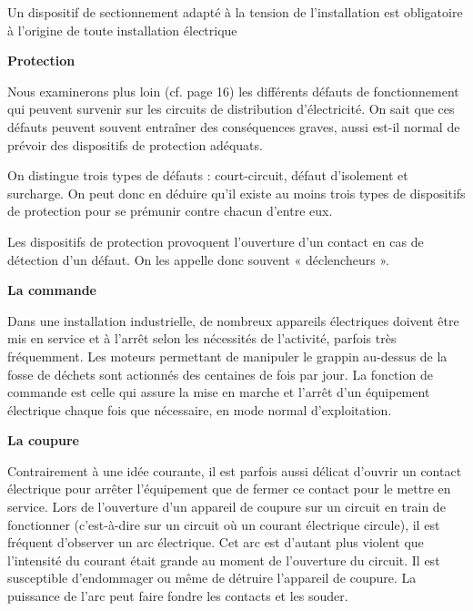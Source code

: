 Un dispositif de sectionnement adapté à la tension de l’installation est obligatoire à l’origine de toute installation électrique

\vspace{0.3cm}
\textbf{Protection}
\vspace{0.3cm}

Nous examinerons plus loin (cf. page 16) les différents défauts de fonctionnement qui peuvent survenir sur les circuits de distribution d’électricité. On sait que ces défauts peuvent souvent entraîner des conséquences graves, aussi est-il normal de prévoir des dispositifs de protection adéquats.
\vspace{0.3cm}

On distingue trois types de défauts : court-circuit, défaut d’isolement et surcharge. On peut donc en déduire qu’il existe au moins trois types de dispositifs de protection pour se prémunir contre chacun d’entre eux.
\vspace{0.3cm}

Les dispositifs de protection provoquent l’ouverture d’un contact en cas de détection d’un défaut. On les appelle donc souvent « déclencheurs ».



\vspace{0.3cm}
\textbf{La commande}
\vspace{0.3cm}

Dans une installation industrielle, de nombreux appareils électriques doivent être mis en service et à l’arrêt selon les nécessités de l’activité, parfois très fréquemment. Les moteurs permettant de manipuler le grappin au-dessus de la fosse de déchets sont actionnés des centaines de fois par jour.
La fonction de commande est celle qui assure la mise en marche et l’arrêt d’un équipement électrique chaque fois que nécessaire, en mode normal d’exploitation.

\vspace{0.3cm}
\textbf{La coupure}
\vspace{0.3cm}

Contrairement à une idée courante, il est parfois aussi délicat d’ouvrir un contact électrique pour arrêter l’équipement que de fermer ce contact pour le mettre en service. Lors de l’ouverture d’un appareil de coupure sur un circuit en train de fonctionner (c’est-à-dire sur un circuit où un courant électrique circule), il est fréquent d’observer un arc électrique. Cet arc est d’autant plus violent que l’intensité du courant était grande au moment de l’ouverture du circuit. Il est susceptible d’endommager ou même de détruire l’appareil de coupure. La puissance de l’arc peut faire fondre les contacts et les souder.
\vspace{0.3cm}

